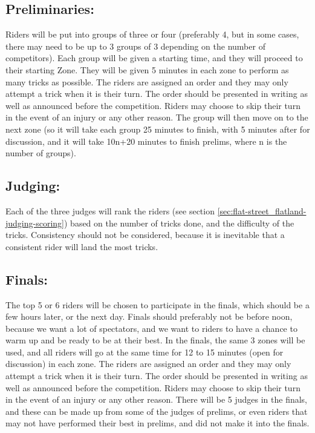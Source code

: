 \subsection{Preliminaries:}
Riders will be put into groups of three or four (preferably 4, but in some cases, there may need to be up to 3 groups of 3 depending on the number of competitors).
Each group will be given a starting time, and they will proceed to their starting Zone.
They will be given 5 minutes in each zone to perform as many tricks as possible.
The riders are assigned an order and they may only attempt a trick when it is their turn.
The order should be presented in writing as well as announced before the competition.
Riders may choose to skip their turn in the event of an injury or any other reason.
The group will then move on to the next zone (so it will take each group 25 minutes to finish, with 5 minutes after for discussion, and it will take 10n+20 minutes to finish prelims, where n is the number of groups).

\subsection{Judging:}
Each of the three judges will rank the riders (see section \ref{sec:flat-street_flatland-judging-scoring}) based on the number of tricks done, and the difficulty of the tricks.
Consistency should not be considered, because it is inevitable that a consistent rider will land the most tricks.

\subsection{Finals:}
The top 5 or 6 riders will be chosen to participate in the finals, which should be a few hours later, or the next day.
Finals should preferably not be before noon, because we want a lot of spectators, and we want to riders to have a chance to warm up and be ready to be at their best.
In the finals, the same 3 zones will be used, and all riders will go at the same time for 12 to 15 minutes (open for discussion) in each zone.
The riders are assigned an order and they may only attempt a trick when it is their turn.
The order should be presented in writing as well as announced before the competition.
Riders may choose to skip their turn in the event of an injury or any other reason.
There will be 5 judges in the finals, and these can be made up from some of the judges of prelims, or even riders that may not have performed their best in prelims, and did not make it into the finals.

